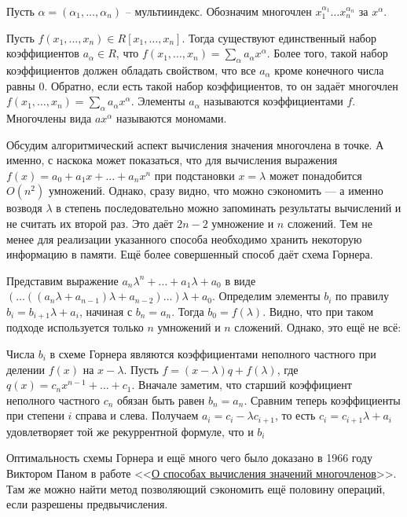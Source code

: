 \dfn Пусть $\alpha=(\alpha_1,\dots,\alpha_n)$ -- мультииндекс. Обозначим многочлен $x_1^{\alpha_1}\dots x_n^{\alpha_n}$ за $x^{\alpha}$.
\edfn

\rm Пусть $f(x_1,\dots,x_n) \in R[x_1,\dots,x_n]$. Тогда существуют единственный набор коэффициентов $a_{\alpha}\in R$, что $f(x_1,\dots,x_n)=\sum_{\alpha} a_{\alpha}x^{\alpha}$. Более того, такой набор коэффициентов должен обладать свойством, что все $a_{\alpha}$ кроме конечного числа равны 0. Обратно, если есть такой набор коэффициентов, то он задаёт многочлен $f(x_1,\dots,x_n)=\sum_{\alpha} a_{\alpha}x^{\alpha}$. Элементы $a_{\alpha}$ называются коэффициентами $f$. Многочлены вида $ax^{\alpha}$ называются мономами.
 \erm




 

Обсудим алгоритмический аспект вычисления значения многочлена в точке. А именно, с наскока может показаться, что для вычисления выражения $f(x)=a_0+a_1x+\dots+a_nx^n$ при подстановки $x=\lambda$ может понадобится $O(n^2)$ умножений. Однако, сразу видно, что можно сэкономить --- а именно возводя $\lambda$ в степень последовательно можно запоминать результаты вычислений и не считать их второй раз. Это даёт $2n-2$ умножение и $n$ сложений. Тем не менее для реализации указанного способа необходимо хранить некоторую информацию в памяти. Ещё более совершенный способ даёт схема Горнера. 

Представим выражение $a_n\lambda^n+\dots+a_1\lambda+a_0$ в виде $(\dots((a_n\lambda+a_{n-1})\lambda+a_{n-2})\dots)\lambda+a_0$. Определим элементы $b_i$ по правилу $b_i=b_{i+1}\lambda+a_i$, начиная с $b_n=a_n$. Тогда $b_0=f(\lambda)$. Видно, что при таком подходе используется только $n$ умножений и $n$ сложений. Однако, это ещё не всё:

\lm Числа $b_i$ в схеме Горнера являются коэффициентами неполного частного при делении $f(x)$ на $x-\lambda$. 
\elm
\proof
Пусть $f=(x-\lambda)q+f(\lambda)$, где $q(x)=c_nx^{n-1} +\dots +c_1$. Вначале заметим, что старший коэффициент неполного частного $c_n$ обязан быть равен $b_n=a_n$. Сравним теперь коэффициенты при степени $i$ справа и слева. Получаем $a_{i}=c_{i}-\lambda c_{i+1}$, то есть $c_i=c_{i+1}\lambda +a_{i}$ удовлетворяет той же рекуррентной формуле, что и $b_i$
\endproof

Оптимальность схемы Горнера и ещё много чего было доказано в 1966 году Виктором Паном в работе <<\href{http://www.mathnet.ru/php/archive.phtml?wshow=paper&jrnid=rm&paperid=5823&option_lang=rus}{О способах вычисления значений многочленов}>>. Там же можно найти метод позволяющий сэкономить ещё половину операций, если разрешены предвычисления.




